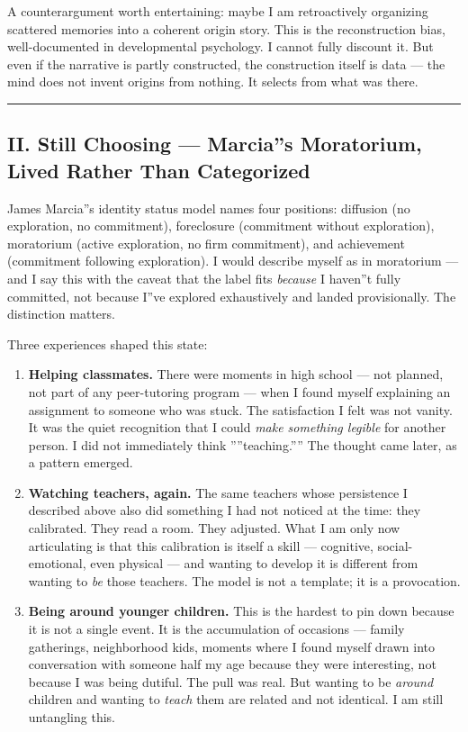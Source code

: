 \documentclass[12pt,a4paper]{article}
\begin{document}
A counterargument worth entertaining: maybe I am retroactively organizing scattered memories into a coherent origin story. This is the reconstruction bias, well-documented in developmental psychology. I cannot fully discount it. But even if the narrative is partly constructed, the construction itself is data --- the mind does not invent origins from nothing. It selects from what was there.

\begin{center}
\rule{0.5\textwidth}{0.4pt}
\end{center}

\subsection{II. Still Choosing --- Marcia''s Moratorium, Lived Rather Than Categorized}

James Marcia''s identity status model names four positions: diffusion (no exploration, no commitment), foreclosure (commitment without exploration), moratorium (active exploration, no firm commitment), and achievement (commitment following exploration). I would describe myself as in moratorium --- and I say this with the caveat that the label fits \emph{because} I haven''t fully committed, not because I''ve explored exhaustively and landed provisionally. The distinction matters.

Three experiences shaped this state:

\begin{enumerate}
    \item \textbf{Helping classmates.} There were moments in high school --- not planned, not part of any peer-tutoring program --- when I found myself explaining an assignment to someone who was stuck. The satisfaction I felt was not vanity. It was the quiet recognition that I could \emph{make something legible} for another person. I did not immediately think ''''teaching.'''' The thought came later, as a pattern emerged.
    \item \textbf{Watching teachers, again.} The same teachers whose persistence I described above also did something I had not noticed at the time: they calibrated. They read a room. They adjusted. What I am only now articulating is that this calibration is itself a skill --- cognitive, social-emotional, even physical --- and wanting to develop it is different from wanting to \emph{be} those teachers. The model is not a template; it is a provocation.
    \item \textbf{Being around younger children.} This is the hardest to pin down because it is not a single event. It is the accumulation of occasions --- family gatherings, neighborhood kids, moments where I found myself drawn into conversation with someone half my age because they were interesting, not because I was being dutiful. The pull was real. But wanting to be \emph{around} children and wanting to \emph{teach} them are related and not identical. I am still untangling this.
\end{enumerate}
\end{document}
